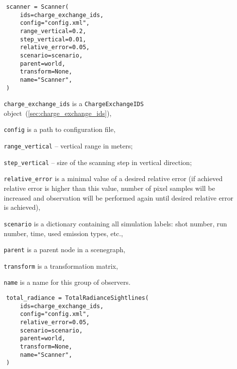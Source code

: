 \documentclass[../../main]{subfiles}
\begin{document}
\begin{verbatim}
    scanner = Scanner(
        ids=charge_exchange_ids,
        config="config.xml",
        range_vertical=0.2,
        step_vertical=0.01,
        relative_error=0.05,
        scenario=scenario,
        parent=world,
        transform=None,
        name="Scanner",
    )
\end{verbatim}

\begin{itemize}[align=left]
    \item[\texttt{charge\_exchange\_ids}] is a \texttt{ChargeExchangeIDS} object~(\cref{sec:charge_exchange_ids}),
    \item[\texttt{config}] is a path to configuration file,
    \item[\texttt{range\_vertical}] -- vertical range in meters;
    \item[\texttt{step\_vertical}] -- size of the scanning step in vertical direction;
    \item[\texttt{relative\_error}] is a minimal value of a desired relative error (if achieved relative error is higher than this value, number of pixel samples will be increased and observation will be performed again until desired relative error is achieved),
    \item[\texttt{scenario}] is a dictionary containing all simulation labels: shot number, run number, time, used emission types, etc.,
    \item[\texttt{parent}] is a parent node in a scenegraph,
    \item[\texttt{transform}] is a transformation matrix,
    \item[\texttt{name}] is a name for this group of observers.
\end{itemize}

\begin{verbatim}
    total_radiance = TotalRadianceSightlines(
        ids=charge_exchange_ids,
        config="config.xml",
        relative_error=0.05,
        scenario=scenario,
        parent=world,
        transform=None,
        name="Scanner",
    )
\end{verbatim}
\end{document}
